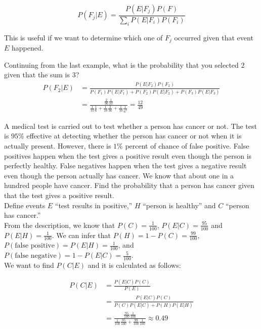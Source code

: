 $$P(F_j|E)=\frac{P(E|F_j)P(F)}{\sum_i P(E|F_i) P(F_i)}$$

This is useful if we want to determine which one of $F_j$ occurred given that event $E$ happened.

\begin{texample}
	Continuing from the last example, what is the probability that you selected $2$ given that the sum is $3$? \\
	
	\begin{align*}
		P(F_2|E)&=\frac{P(E|F_2)P(F_2)}{P(F_1)P(E|F_1)+P(F_2)P(E|F_2)+P(F_3)P(E|F_3)} \\
		&=\frac{\frac{2}{36}\frac{1}{10}}{\frac{1}{10}\frac16 + \frac{1}{10}\frac{2}{36}+\frac{1}{10}\frac{1}{6^3}}=\frac{12}{49}
	\end{align*}
\end{texample}

\begin{texample}
	A medical test is carried out to test whether a person has cancer or not. The test is $95\%$ effective at detecting whether the person has cancer or not when it is actually present. However, there is $1\%$ percent of chance of false positive. False positives happen when the test gives a positive result even though the person is perfectly healthy. False negatives happen when the test gives a negative result even though the person actually has cancer. We know that about one in a hundred people have cancer. Find the probability that a person has cancer given that the test gives a positive result. \\
	
	Define events $E$ ``test results in positive,'' $H$ ``person is healthy'' and $C$ ``person has cancer.'' \\
	
	From the description, we know that $P(C)=\frac{1}{100}$, $P(E|C)=\frac{95}{100}$ and $P(E|H)=\frac{1}{100}$. We can infer that $P(H)=1-P(C)=\frac{99}{100}$, $P(\text{false positive})=P(E|H)=\frac{1}{100}$, and $P(\text{false negative})=1-P(E|C)=\frac{5}{100}$. \\
	
	We want to find $P(C|E)$ and it is calculated as follows:
	
	\begin{align*}
		P(C|E)&=\frac{P(E|C)P(C)}{P(E)} \\
		&=\frac{P(E|C)P(C)}{P(C)P(E|C)+P(H)P(E|H)} \\
		&=\frac{\frac{95}{100}\frac{1}{100}}{\frac{1}{100}\frac{95}{100}+\frac{99}{100}\frac{1}{100}} \approx 0.49
	\end{align*}
\end{texample}

